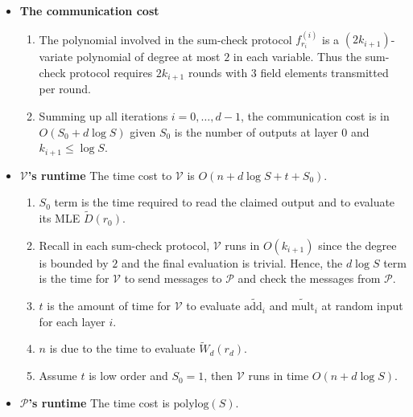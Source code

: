\documentclass{article}
\begin{document}
\begin{itemize}
\item \textbf{The communication cost}
\begin{enumerate}[$\circ$]
\item\label{item:18} The polynomial involved in the sum-check protocol $f_{r_i}^{(i)}$ is a $(2k_{i+1})$-variate polynomial of degree at most $2$ in each variable. Thus the sum-check protocol requires $2k_{i+1}$ rounds with $3$ field elements transmitted per round. 
\item\label{item:19} Summing up all iterations $ i = 0, \dots, d - 1$, the communication cost is in $O(S_0 + d \log S)$ given $S_0$ is the number of outputs at layer $0$ and $k_{i+1} \leq \log S$.
\end{enumerate}

\item \textbf{$\mathcal{V}$'s runtime} The time cost to $\mathcal{V}$ is $O(n + d \log S + t + S_0)$.
\begin{enumerate} [$\circ$]
\item\label{item:20} $S_0$ term is the time required to read the claimed output and to evaluate its MLE $\widetilde{D}(r_0)$. 
\item\label{item:21} Recall in each sum-check protocol, $\mathcal{V}$ runs in $O(k_{i+1})$ since the degree is bounded by $2$ and the final evaluation is trivial. Hence, the $d \log S$ term is the time for $\mathcal{V}$ to send messages to $\mathcal{P}$ and check the messages from $\mathcal{P}$. 
\item\label{item:25} $t$ is the amount of time for $\mathcal{V}$ to evaluate $ \widetilde{\text{add}_i}$ and $\widetilde{\text{mult}}_i$ at random input for each layer $i$. 
\item\label{item:26} $n$ is due to the time to evaluate $\widetilde{W}_d(r_d)$. 
\item\label{item:27} Assume $t$ is low order and $S_0 = 1$, then $\mathcal{V}$ runs in time $O(n + d \log S)$.
\end{enumerate}

\item \textbf{$\mathcal{P}$'s runtime} The time cost is $\text{polylog}(S)$.


\end{itemize}
\end{document}
